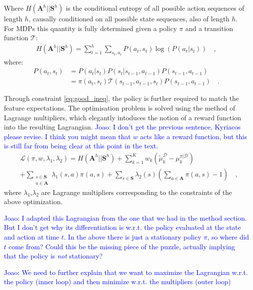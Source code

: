 \documentclass[letterpaper]{article}
\newcommand{\jm}[1]{\textcolor{blue}{Joao: #1}}
\newcommand{\jm}[1]{}
\begin{document}
Where $H(\mathbf{A}^h||\mathbf{S}^h)$ is the conditional entropy of all possible action sequences of length $h$, causally conditioned on all possible state sequences, also of length $h$. For MDPs this quantity is fully determined given a policy $\pi$ and a transition function $\mathcal{T}$:
\begin{align}
H(\mathbf{A}^h||\mathbf{S}^h) = \sum_{t=1}^h \sum_{s_t,a_t} P(a_t,s_t)\log(P(a_t|s_t))\quad,
\label{eg:entdef}
\end{align}
where:
\begin{align*}
  P(a_t,s_t)&= P(a_t|s_t)P(s_t|s_{t-1},a_{t-1})P(s_{t-1},a_{t-1})\\
  &=\pi(a_t,s_t)\mathcal T(s_{t-1},a_{t-1},s_t)P(s_{t-1},a_{t-1})\quad.
\end{align*}
	
Through constraint \eqref{eq:good_ineq}, the policy is further required to match the feature expectations. The optimisation problem is solved using the method of Lagrange multipliers, which elegantly intoduces the notion of a reward function into the resulting Lagrangian. \jm{I don't get the previous sentence, Kyriacos please revise. I think you might mean that $w$ acts like a reward function, but this is still far from being clear at this point in the text.}
\begin{equation}
	\begin{split}
	&\mathcal{L}(\pi,w,\lambda_1,\lambda_2) = H(\mathbf{A}^h||\mathbf{S}^h) + \sum_{k=1}^Kw_k(\widetilde{\mu}^{\mathcal{D}}_k-\mu^{\pi |\mathcal{D}}_k)\\
	&+ \sum\limits_{\substack{s\in\mathbf{S}\\a\in\mathbf{A}}}\lambda_{1}(s,a) \pi(a,s) + \sum_{s\in\mathbf{S}}\lambda_{2}(s) (\sum_{a\in\mathbf{A}}\pi(a,s)-1)\quad,
	\end{split}
\end{equation}
where $\lambda_1$,$\lambda_2$ are Lagrange multipliers corresponding to the constraints of the above optimization.

\jm{I adapted this Lagrangian from the one that we had in the method section. But I don't get why its differentiation is w.r.t. the policy evaluated at the state and action at time $t$. In the above there is just a stationary policy $\pi$, so where did $t$ come from? Could this be the missing piece of the puzzle, actually implying that the policy is \emph{not} stationary?}

\jm{We need to further explain that we want to maximize the Lagrangian w.r.t. the policy (inner loop) and then minimize w.r.t. the multipliers (outer loop)}
\end{document}
